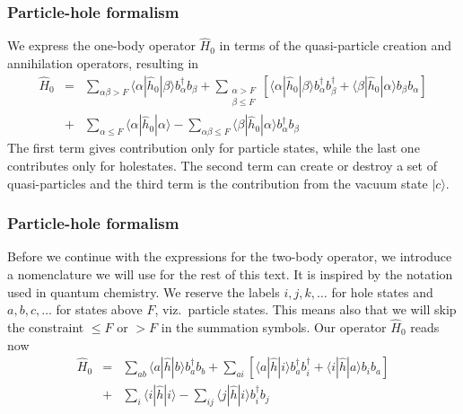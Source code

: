 \documentclass{beamer}
\begin{document}
\begin{frame}
\frametitle{Particle-hole formalism}

\begin{block}{}
We express the one-body operator $\hat{H}_0$ in terms of the quasi-particle creation and annihilation operators, resulting in
\begin{eqnarray}
	\hat{H}_0 &=& \sum_{\alpha\beta > F} \langle \alpha|\hat{h}_0|\beta\rangle  b_\alpha^\dagger b_\beta +
		\sum_{\begin{array}{c} \alpha > F \\ \beta \leq F \end{array}} \left[
		\langle \alpha|\hat{h}_0|\beta\rangle b_\alpha^\dagger b_\beta^\dagger + 
		\langle \beta|\hat{h}_0|\alpha\rangle b_\beta  b_\alpha \right] \nonumber \\
	&+& \sum_{\alpha \leq F} \langle \alpha|\hat{h}_0|\alpha\rangle - 
		\sum_{\alpha\beta \leq F} \langle \beta|\hat{h}_0|\alpha\rangle
		b_\alpha^\dagger b_\beta \label{eq:2-63b}
\end{eqnarray}
The first term  gives contribution only for particle states, while the last one
contributes only for holestates. The second term can create or destroy a set of
quasi-particles and 
the third term is the contribution  from the vacuum state $|c\rangle$.
\end{block}
\end{frame}

\begin{frame}
\frametitle{Particle-hole formalism}

\begin{block}{}
Before we continue with the expressions for the two-body operator, we introduce a nomenclature we will use for the rest of this
text. It is inspired by the notation used in quantum chemistry.
We reserve the labels $i,j,k,\dots$ for hole states and $a,b,c,\dots$ for states above $F$, viz.~particle states.
This means also that we will skip the constraint $\leq F$ or $> F$ in the summation symbols. 
Our operator $\hat{H}_0$  reads now 
\begin{eqnarray}
	\hat{H}_0 &=& \sum_{ab} \langle a|\hat{h}|b\rangle b_a^\dagger b_b +
		\sum_{ai} \left[
		\langle a|\hat{h}|i\rangle b_a^\dagger b_i^\dagger + 
		\langle i|\hat{h}|a\rangle b_i  b_a \right] \nonumber \\
	&+& \sum_{i} \langle i|\hat{h}|i\rangle - 
		\sum_{ij} \langle j|\hat{h}|i\rangle
		b_i^\dagger b_j \label{eq:2-63b}
\end{eqnarray} 
\end{block}
\end{frame}
\end{document}
